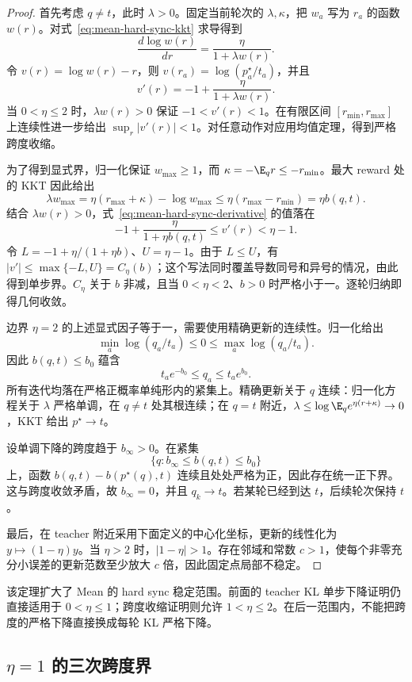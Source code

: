 \begin{proof}
首先考虑 $q\ne t$，此时 $\lambda>0$。固定当前轮次的 $\lambda,\kappa$，把 $w_a$ 写为 $r_a$ 的函数 $w(r)$。对式~\eqref{eq:mean-hard-sync-kkt} 求导得到
\[
 \frac{d\log w(r)}{dr}=\frac{\eta}{1+\lambda w(r)}.
\]
令 $v(r)=\log w(r)-r$，则 $v(r_a)=\log(p_a^\star/t_a)$，并且
\begin{equation}
 v'(r)=-1+\frac{\eta}{1+\lambda w(r)}.
 \label{eq:mean-hard-sync-derivative}
\end{equation}
当 $0<\eta\le2$ 时，$\lambda w(r)>0$ 保证 $-1<v'(r)<1$。在有限区间 $[r_{\min},r_{\max}]$ 上连续性进一步给出 $\sup_r|v'(r)|<1$。对任意动作对应用均值定理，得到严格跨度收缩。

为了得到显式界，归一化保证 $w_{\max}\ge1$，而 $\kappa=-\E_qr\le-r_{\min}$。最大 reward 处的 KKT 因此给出
\[
 \lambda w_{\max}
 =\eta(r_{\max}+\kappa)-\log w_{\max}
 \le\eta(r_{\max}-r_{\min})=\eta b(q,t).
\]
结合 $\lambda w(r)>0$，式~\eqref{eq:mean-hard-sync-derivative} 的值落在
\[
 -1+\frac{\eta}{1+\eta b(q,t)}\le v'(r)<\eta-1.
\]
令 $L=-1+\eta/(1+\eta b)$、$U=\eta-1$。由于 $L\le U$，有 $|v'|\le\max\{-L,U\}=C_\eta(b)$；这个写法同时覆盖导数同号和异号的情况，由此得到单步界。$C_\eta$ 关于 $b$ 非减，且当 $0<\eta<2$、$b>0$ 时严格小于一。逐轮归纳即得几何收敛。

边界 $\eta=2$ 的上述显式因子等于一，需要使用精确更新的连续性。归一化给出
\[
 \min_a\log(q_a/t_a)\le0\le\max_a\log(q_a/t_a).
\]
因此 $b(q,t)\le b_0$ 蕴含
\[
 t_ae^{-b_0}\le q_a\le t_ae^{b_0}.
\]
所有迭代均落在严格正概率单纯形内的紧集上。精确更新关于 $q$ 连续：归一化方程关于 $\lambda$ 严格单调，在 $q\ne t$ 处其根连续；在 $q=t$ 附近，$\lambda\le\log\E_qe^{\eta(r+\kappa)}\to0$，KKT 给出 $p^\star\to t$。

设单调下降的跨度趋于 $b_\infty>0$。在紧集
\[
 \{q:b_\infty\le b(q,t)\le b_0\}
\]
上，函数 $b(q,t)-b(p^\star(q),t)$ 连续且处处严格为正，因此存在统一正下界。这与跨度收敛矛盾，故 $b_\infty=0$，并且 $q_k\to t$。若某轮已经到达 $t$，后续轮次保持 $t$。

最后，在 teacher 附近采用下面定义的中心化坐标，更新的线性化为 $y\mapsto(1-\eta)y$。当 $\eta>2$ 时，$|1-\eta|>1$。存在邻域和常数 $c>1$，使每个非零充分小误差的更新范数至少放大 $c$ 倍，因此固定点局部不稳定。
\end{proof}

该定理扩大了 Mean 的 hard sync 稳定范围。前面的 teacher KL 单步下降证明仍直接适用于 $0<\eta\le1$；跨度收缩证明则允许 $1<\eta\le2$。在后一范围内，不能把跨度的严格下降直接换成每轮 KL 严格下降。

\subsection{$\eta=1$ 的三次跨度界}
\label{sec:mean-hard-sync-cubic-span}

